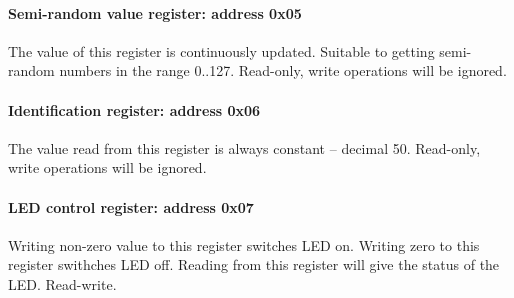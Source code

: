 \documentclass{article}
\begin{document}
\paragraph{Semi-random value register: address 0x05}
The value of this register is continuously updated. Suitable to getting semi-random numbers in the range 0..127.
Read-only, write operations will be ignored.
\paragraph{Identification register: address 0x06}
The value read from this register is always constant -- decimal 50.
Read-only, write operations will be ignored.
\paragraph{LED control register: address 0x07}
Writing non-zero value to this register switches LED on. Writing zero to this register swithches LED off. Reading from this register will give the status of the LED.
Read-write.
\end{document}
